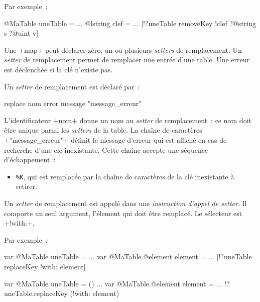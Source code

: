 Par exemple~:
\begin{galgas3}
@MaTable uneTable = {}
...
@lstring clef = ...
[!?uneTable removeKey !clef ?@string s ?@uint v]
\end{galgas3}










Une \ggst+map+ peut déclarer zéro, un ou plusieurs \emph{setters} de remplacement. Un \emph{setter} de remplacement permet de remplacer une entrée d'une table. Une erreur est déclenchée si la clé n'existe pas.


Un \emph{setter} de remplacement est déclaré par~:

\begin{galgas3}
replace nom error message "message_erreur"
\end{galgas3}

\begin{galgas4}
\end{galgas4}

L'identificateur \ggst+nom+ donne un nom au \emph{setter} de remplacement~; ce nom doit être unique parmi les \emph{setters} de la table. La chaîne de caractères \ggst+"message_erreur"+ définit le message d'erreur qui est affiché en cas de recherche d'une clé inexistante. Cette chaîne accepte une séquence d'échappement~:
\begin{itemize}
  \item \texttt{\%K}, qui est remplacée par la chaîne de caractères de la clé inexistante à retirer.
\end{itemize}


Un \emph{setter} de remplacement est appelé dans une \emph{instruction d'appel de setter}. Il comporte un seul argument, l'élement qui doit être remplacé. Le sélecteur est \ggsq+!with:+.


Par exemple~:

\begin{galgas3}
var @MaTable uneTable = {}
...
var @MaTable.@element element = ...
[!?uneTable replaceKey !with: element]
\end{galgas3}


\begin{galgas4}
var @MaTable uneTable = ()
...
var @MaTable.@element element = ...
!?uneTable.replaceKey (!with: element)
\end{galgas4}







